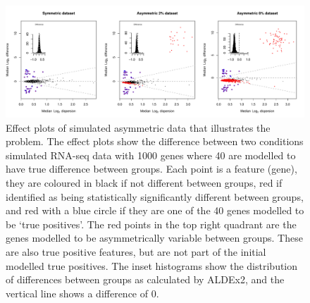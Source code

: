 \documentclass [10pt]{article}
\begin{document}
\begin{figure}[ht]
\includegraphics[width=6in]{../figures/Fig_1.pdf}
\vspace{3mm} \caption{Effect plots of simulated asymmetric data that illustrates the problem. The effect plots show the difference between two conditions simulated RNA-seq data with 1000 genes where 40 are modelled to have true difference between groups. Each point is a feature (gene), they are coloured in black if not different between groups, red if identified as being statistically significantly different between groups, and red with a blue circle if they are one of the 40  genes modelled to be  `true positives'. The red points in the top right quadrant are the genes modelled to be asymmetrically variable between groups. These are also true positive features, but are not part of the initial modelled true positives. The inset histograms show the distribution of differences between groups as calculated by ALDEx2, and the vertical line shows a difference of 0.}
\label{Fig:f1a}
\end{figure}
\end{document}
